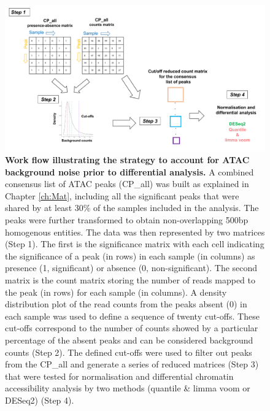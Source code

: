 \begin{landscape}
\begin{figure}[htbp]
\centering
\includegraphics[width=1.2\textwidth]{./Results1/pdfs/ATAC_master_list_filtering_flow_chart}
\caption[Work flow illustrating the strategy to account for ATAC background noise prior to differential analysis.]{\textbf{Work flow illustrating the strategy to account for ATAC background noise prior to differential analysis.} A combined consensus list of ATAC peaks (CP\_all) was built as explained in Chapter \ref{ch:Mat}, including all the significant peaks that were shared by at least 30\% of the samples included in the analysis. The peaks were further transformed to obtain non-overlapping 500bp homogenous entities. The data was then represented by two matrices (Step 1). The first is the significance matrix with each cell indicating the significance of a peak (in rows) in each sample (in columns) as presence (1, significant) or absence (0, non-significant). The second matrix is the count matrix storing the number of reads mapped to the peak (in rows) for each sample (in columns). A density distribution plot of the read counts from the peaks absent (0) in each sample was used to define a sequence of twenty cut-offs. These cut-offs correspond to the number of counts showed by a particular percentage of the absent peaks and can be considered background counts (Step 2). The defined cut-offs were used to filter out peaks from the CP\_all and generate a series of reduced matrices (Step 3) that were tested for normalisation and differential chromatin accessibility analysis by two methods (quantile \& limma voom or DESeq2) (Step 4).}
\label{figure:ML_workflow}
\end{figure}
\end{landscape}



